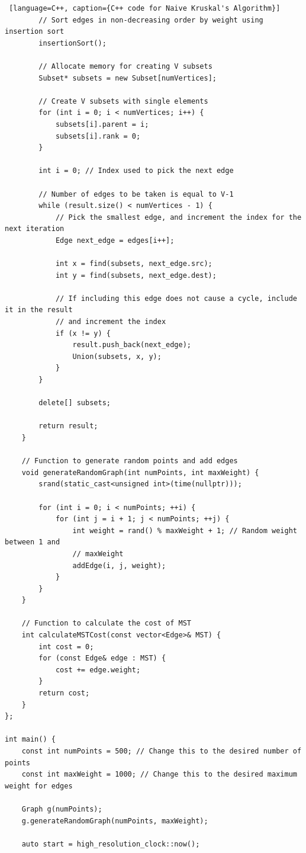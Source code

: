 \documentclass[a4paper, 10pt, twocolumn]{article}
\begin{document}
\begin{lstlisting} [language=C++, caption={C++ code for Naive Kruskal's Algorithm}]
        // Sort edges in non-decreasing order by weight using insertion sort
        insertionSort();

        // Allocate memory for creating V subsets
        Subset* subsets = new Subset[numVertices];

        // Create V subsets with single elements
        for (int i = 0; i < numVertices; i++) {
            subsets[i].parent = i;
            subsets[i].rank = 0;
        }

        int i = 0; // Index used to pick the next edge

        // Number of edges to be taken is equal to V-1
        while (result.size() < numVertices - 1) {
            // Pick the smallest edge, and increment the index for the next iteration
            Edge next_edge = edges[i++];

            int x = find(subsets, next_edge.src);
            int y = find(subsets, next_edge.dest);

            // If including this edge does not cause a cycle, include it in the result 
            // and increment the index
            if (x != y) {
                result.push_back(next_edge);
                Union(subsets, x, y);
            }
        }

        delete[] subsets;

        return result;
    }

    // Function to generate random points and add edges
    void generateRandomGraph(int numPoints, int maxWeight) {
        srand(static_cast<unsigned int>(time(nullptr)));

        for (int i = 0; i < numPoints; ++i) {
            for (int j = i + 1; j < numPoints; ++j) {
                int weight = rand() % maxWeight + 1; // Random weight between 1 and 
                // maxWeight
                addEdge(i, j, weight);
            }
        }
    }

    // Function to calculate the cost of MST
    int calculateMSTCost(const vector<Edge>& MST) {
        int cost = 0;
        for (const Edge& edge : MST) {
            cost += edge.weight;
        }
        return cost;
    }
};

int main() {
    const int numPoints = 500; // Change this to the desired number of points
    const int maxWeight = 1000; // Change this to the desired maximum weight for edges

    Graph g(numPoints);
    g.generateRandomGraph(numPoints, maxWeight);

    auto start = high_resolution_clock::now();


\end{lstlisting}
\end{document}
